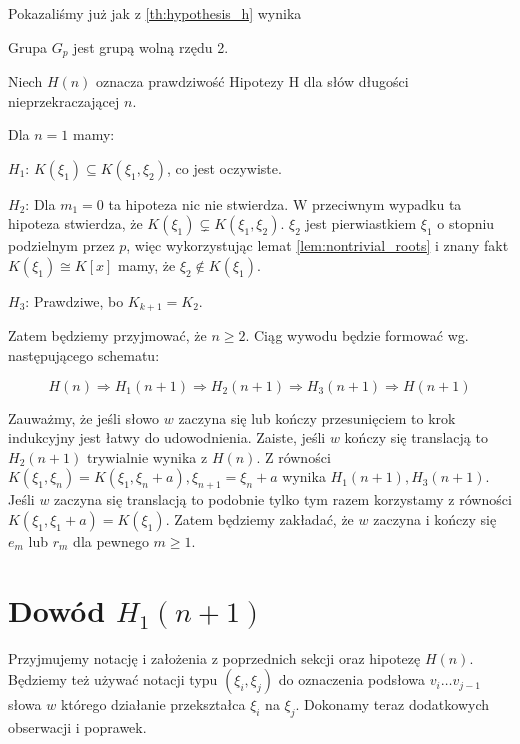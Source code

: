 Pokazaliśmy już jak z \ref{th:hypothesis_h} wynika

\begin{corollary}
  Grupa $G_p$ jest grupą wolną rzędu 2.
\end{corollary}

Niech $H(n)$ oznacza prawdziwość Hipotezy H dla słów długości nieprzekraczającej
$n$.

Dla $n=1$ mamy:
\begin{description}
  \item{$H_1$:}
    $K\left(\xi_1\right) \subseteq K\left(\xi_1, \xi_2\right)$, co jest
    oczywiste.
  \item{$H_2$:} Dla $m_1 = 0$ ta hipoteza nic nie stwierdza. W przeciwnym
    wypadku ta hipoteza stwierdza, że $K\left(\xi_1\right) \subsetneq K\left(\xi_1,
    \xi_2\right)$. $\xi_2$ jest pierwiastkiem $\xi_1$ o stopniu podzielnym przez
    $p$, więc wykorzystując lemat \ref{lem:nontrivial_roots} i znany fakt
    $K\left(\xi_1\right) \cong K[x]$ mamy, że $\xi_2 \not \in
    K\left(\xi_1\right)$.
  \item{$H_3$:} Prawdziwe, bo $K_{k+1} = K_2$.

\end{description}

Zatem będziemy przyjmować, że $n \geq 2$. Ciąg wywodu będzie formować wg.
następującego schematu:

\[ H(n) \Rightarrow H_1(n+1) \Rightarrow H_2(n+1) \Rightarrow H_3(n+1)
\Rightarrow H(n+1)\]

Zauważmy, że jeśli słowo $w$ zaczyna się lub kończy przesunięciem to krok
indukcyjny jest łatwy do udowodnienia. Zaiste, jeśli $w$ kończy się translacją
to $H_2(n+1)$ trywialnie wynika z $H(n)$.  Z równości $K\left(\xi_1,
\xi_{n}\right) = K\left(\xi_1, \xi_{n} + a\right), \xi_{n+1} = \xi_n + a$ wynika
$H_1(n+1), H_3(n+1)$. Jeśli $w$ zaczyna się translacją to podobnie tylko tym
razem korzystamy z równości $K\left(\xi_1, \xi_1 + a\right) =
K\left(\xi_1\right)$. Zatem będziemy zakładać, że $w$ zaczyna i kończy się $e_m$
lub $r_m$ dla pewnego $m \geq 1$.

\section{Dowód $H_1(n+1)$}
Przyjmujemy notację i założenia z poprzednich sekcji oraz hipotezę $H(n)$.
Będziemy też używać notacji typu $\left(\xi_i, \xi_j\right)$ do oznaczenia
podsłowa $v_i\ldots v_{j-1}$ słowa $w$ którego działanie przekształca $\xi_i$ na
$\xi_j$. Dokonamy teraz dodatkowych obserwacji i poprawek.

